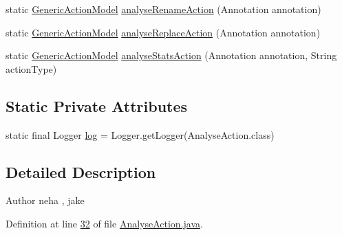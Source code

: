 \begin{DoxyCompactItemize}
\item 
static \hyperlink{interfacecom_1_1poly_1_1nlp_1_1filekommander_1_1views_1_1models_1_1_generic_action_model}{Generic\-Action\-Model} \hyperlink{classcom_1_1poly_1_1nlp_1_1filekommander_1_1file_1_1actions_1_1_analyse_action_aade5e40cbf6a964d4b95b81815cea68f}{analyse\-Rename\-Action} (Annotation annotation)
\item 
static \hyperlink{interfacecom_1_1poly_1_1nlp_1_1filekommander_1_1views_1_1models_1_1_generic_action_model}{Generic\-Action\-Model} \hyperlink{classcom_1_1poly_1_1nlp_1_1filekommander_1_1file_1_1actions_1_1_analyse_action_a55c78bdeee6905c8e95f3d8115a6c222}{analyse\-Replace\-Action} (Annotation annotation)
\item 
static \hyperlink{interfacecom_1_1poly_1_1nlp_1_1filekommander_1_1views_1_1models_1_1_generic_action_model}{Generic\-Action\-Model} \hyperlink{classcom_1_1poly_1_1nlp_1_1filekommander_1_1file_1_1actions_1_1_analyse_action_a7bd195f986019e22721f048aec378f67}{analyse\-Stats\-Action} (Annotation annotation, String action\-Type)
\end{DoxyCompactItemize}
\subsection*{Static Private Attributes}
\begin{DoxyCompactItemize}
\item 
static final Logger \hyperlink{classcom_1_1poly_1_1nlp_1_1filekommander_1_1file_1_1actions_1_1_analyse_action_ae99df52b353dd7b0d2014d581fcc8cff}{log} = Logger.\-get\-Logger(Analyse\-Action.\-class)
\end{DoxyCompactItemize}


\subsection{Detailed Description}
\begin{DoxyAuthor}{Author}
neha , jake 
\end{DoxyAuthor}


Definition at line \hyperlink{L32}{32} of file \hyperlink{}{Analyse\-Action.\-java}.




